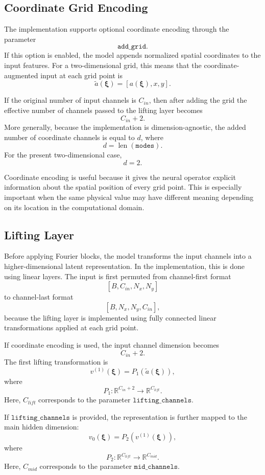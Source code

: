 \documentclass[14pt]{extarticle}
\begin{document}
\subsection{Coordinate Grid Encoding}

The implementation supports optional coordinate encoding through the parameter
\[
\texttt{add\_grid}.
\]
If this option is enabled, the model appends normalized spatial coordinates to the input features. For a two-dimensional grid, this means that the coordinate-augmented input at each grid point is
\[
\tilde{a}(\boldsymbol{\xi})
=
\left[
a(\boldsymbol{\xi}),
x,
y
\right].
\]

If the original number of input channels is \(C_{in}\), then after adding the grid the effective number of channels passed to the lifting layer becomes
\[
C_{in} + 2.
\]
More generally, because the implementation is dimension-agnostic, the added number of coordinate channels is equal to \(d\), where
\[
d = \operatorname{len}(\texttt{modes}).
\]
For the present two-dimensional case,
\[
d=2.
\]

Coordinate encoding is useful because it gives the neural operator explicit information about the spatial position of every grid point. This is especially important when the same physical value may have different meaning depending on its location in the computational domain.

\subsection{Lifting Layer}

Before applying Fourier blocks, the model transforms the input channels into a higher-dimensional latent representation. In the implementation, this is done using linear layers. The input is first permuted from channel-first format
\[
[B, C_{in}, N_x, N_y]
\]
to channel-last format
\[
[B, N_x, N_y, C_{in}],
\]
because the lifting layer is implemented using fully connected linear transformations applied at each grid point.

If coordinate encoding is used, the input channel dimension becomes
\[
C_{in} + 2.
\]
The first lifting transformation is
\[
v^{(1)}(\boldsymbol{\xi})
=
P_1
\left(
\tilde{a}(\boldsymbol{\xi})
\right),
\]
where
\[
P_1:
\mathbb{R}^{C_{in}+2}
\rightarrow
\mathbb{R}^{C_{lift}}.
\]
Here, \(C_{lift}\) corresponds to the parameter \(\texttt{lifting\_channels}\).

If \(\texttt{lifting\_channels}\) is provided, the representation is further mapped to the main hidden dimension:
\[
v_0(\boldsymbol{\xi})
=
P_2
\left(
v^{(1)}(\boldsymbol{\xi})
\right),
\]
where
\[
P_2:
\mathbb{R}^{C_{lift}}
\rightarrow
\mathbb{R}^{C_{mid}}.
\]
Here, \(C_{mid}\) corresponds to the parameter \(\texttt{mid\_channels}\).
\end{document}

